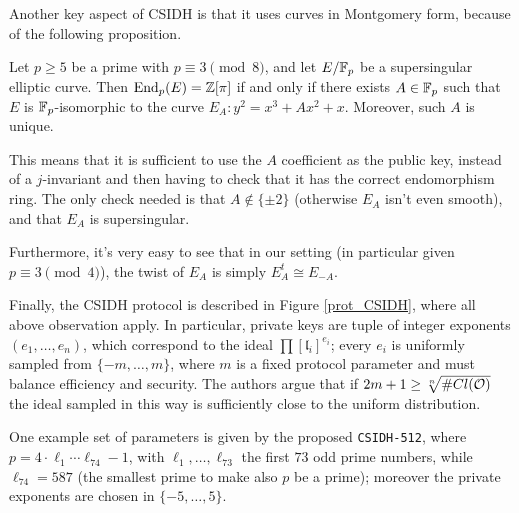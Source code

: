 Another key aspect of CSIDH is that it uses curves in Montgomery form, because of the following proposition.
\begin{proposition}
    Let $p\ge5$ be a prime with $p\equiv3\pmod8$, and let $E/\mathbb{F}_p$ be a supersingular elliptic curve. Then $\operatorname{End}_p(E)=\mathbb{Z}[\pi]$ if and only if there exists $A\in\mathbb{F}_p$ such that $E$ is $\mathbb{F}_p$-isomorphic to the curve $E_A:y^2=x^3+Ax^2+x$. Moreover, such $A$ is unique.
\end{proposition}

This means that it is sufficient to use the $A$ coefficient as the public key, instead of a $j$-invariant and then having to check that it has the correct endomorphism ring. The only check needed is that $A\not\in\{\pm2\}$ (otherwise $E_A$ isn't even smooth), and that $E_A$ is supersingular.

Furthermore, it's very easy to see that in our setting (in particular given $p\equiv3\pmod 4$), the twist of $E_A$ is simply $E_A^t\cong E_{-A}$.

Finally, the CSIDH protocol is described in Figure \ref{prot_CSIDH}, where all above observation apply. In particular, private keys are tuple of integer exponents $(e_1,\dots,e_n)$, which correspond to the ideal $\prod [\mathfrak{l}_i]^{e_i}$; every $e_i$ is uniformly sampled from $\{ -m,\dots,m \}$, where $m$ is a fixed protocol parameter and must balance efficiency and security. The authors argue that if $2m+1\ge\sqrt[n]{\# Cl(\mathcal{O})}$ the ideal sampled in this way is sufficiently close to the uniform distribution.

One example set of parameters is given by the proposed \texttt{CSIDH-512}, where $p=4\cdot\ell_1\cdots\ell_{74}-1$, with $\ell_1,\dots,\ell_{73}$ the first $73$ odd prime numbers, while $\ell_{74}=587$ (the smallest prime to make also $p$ be a prime); moreover the private exponents are chosen in $\{ -5,\dots,5 \}$.

